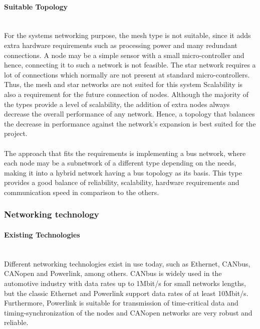 \paragraph{Suitable Topology}~\\
For the systems networking purpose, the mesh type is not suitable, since it adds extra hardware requirements such as processing power and many redundant connections.
A node may be a simple sensor with a small micro-controller and hence, connecting it to such a network is not feasible.
The star network requires a lot of connections which normally are not present at standard micro-controllers.
Thus, the mesh and star networks are not suited for this system
Scalability is also a requirement for the future connection of nodes.
Although the majority of the types provide a level of scalability, the addition of extra nodes always decrease the overall performance of any network.
Hence, a topology that balances the decrease in performance against the network's expansion is best suited for the project.\\\\
The approach that fits the requirements is implementing a bus network, where each node may be a subnetwork of a different type depending on the needs, making it into a hybrid network having a bus topology as its basis.
This type provides a good balance of reliability, scalability, hardware requirements and communication speed in comparison to the others.

\subsubsection{Networking technology}

\paragraph{Existing Technologies}~\\
Different networking technologies exist in use today, such as Ethernet, CANbus, CANopen and Powerlink, among others.
CANbus is widely used in the automotive industry with data rates up to 1Mbit/s for small networks lengths, but the classic Ethernet and Powerlink support data rates of at least 10Mbit/s.
Furthermore, Powerlink is suitable for transmission of time-critical data and timing-synchronization of the nodes and CANopen networks are very robust and reliable.
